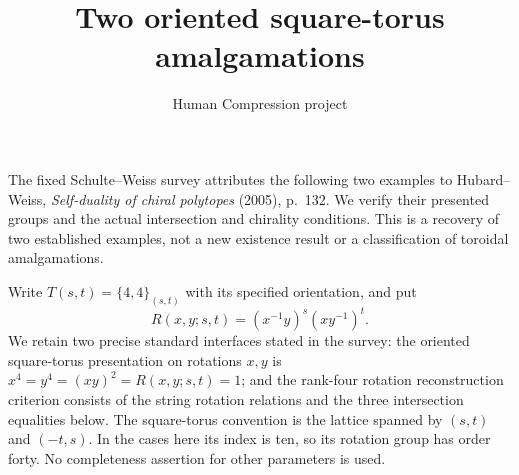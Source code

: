 \documentclass[11pt,a4paper]{article}
\title{Two oriented square-torus amalgamations}
\author{Human Compression project}\date{}
\begin{document}
\maketitle
The fixed Schulte--Weiss survey attributes the following two examples to
Hubard--Weiss, \emph{Self-duality of chiral polytopes} (2005), p.~132.
We verify their presented groups and the actual intersection and chirality
conditions. This is a recovery of two established examples, not a new
existence result or a classification of toroidal amalgamations.

Write $T(s,t)=\{4,4\}_{(s,t)}$ with its specified orientation, and put
\[
 R(x,y;s,t)=(x^{-1}y)^s(xy^{-1})^t.
\]
We retain two precise standard interfaces stated in the survey: the
oriented square-torus presentation on rotations $x,y$ is
$x^4=y^4=(xy)^2=R(x,y;s,t)=1$; and the rank-four rotation reconstruction
criterion consists of the string rotation relations and the three
intersection equalities below. The square-torus convention is the lattice
spanned by $(s,t)$ and $(-t,s)$. In the cases here its index is ten, so
its rotation group has order forty. No completeness assertion for other
parameters is used.
\end{document}
